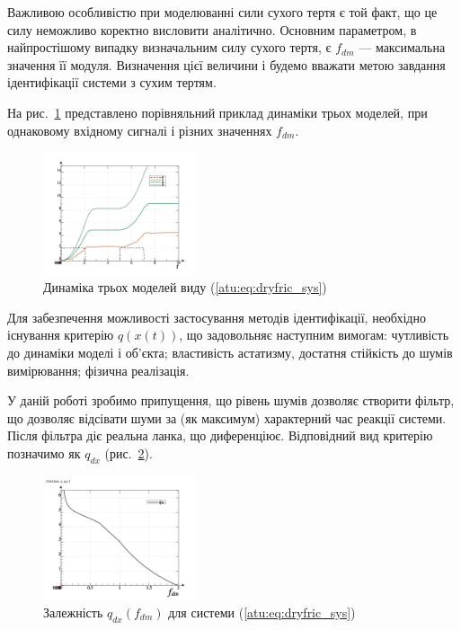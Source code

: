 \documentclass[a4paper,13pt]{atuaref}
\begin{document}
Важливою особливістю при моделюванні сили сухого тертя є той факт, що це силу
неможливо коректно висловити аналітично. Основним параметром, в найпростішому
випадку визначальним силу сухого тертя, є $f_{dm} $ --- максимальна значення її
модуля. Визначення цієї величини і будемо вважати метою завдання ідентифікації
системи з сухим тертям.

На рис.~\ref{atu:f:fric_outs}
представлено порівняльний приклад динаміки трьох моделей,
при однаковому вхідному сигналі і різних значеннях $ f_ {dm} $.

\begin{figure}[htb!]
  \centerline{
    \includegraphics[width=0.4\textwidth]{p5/p/cha/fric/fric_outs.png}
  }
  \caption{Динаміка трьох моделей виду (\ref{atu:eq:dryfric_sys})}
  \label{atu:f:fric_outs}
\end{figure}

Для забезпечення можливості застосування методів ідентифікації, необхідно
існування критерію $ q (x (t)) $, що задовольняє наступним вимогам: чутливість
до динаміки моделі і об'єкта; властивість астатизму, достатня стійкість до
шумів вимірювання; фізична реалізація.

У даній роботі зробимо припущення, що рівень шумів дозволяє створити фільтр, що
дозволяє відсівати шуми за (як максимум) характерний час реакції системи. Після
фільтра діє реальна ланка, що диференціює. Відповідний вид критерію позначимо як
$ q_{dx} $ (рис.~\ref{atu:f:fric_q}).

\begin{figure}[htb!]
\centerline{
  \includegraphics[width=0.40\textwidth]{p5/p/cha/fric/fric_p-p_f_dm_q.png}
}
  \caption{Залежність $q_{dx}(f_{dm})$ для системи (\ref{atu:eq:dryfric_sys}) }
\label{atu:f:fric_q}
\end{figure}
\end{document}
